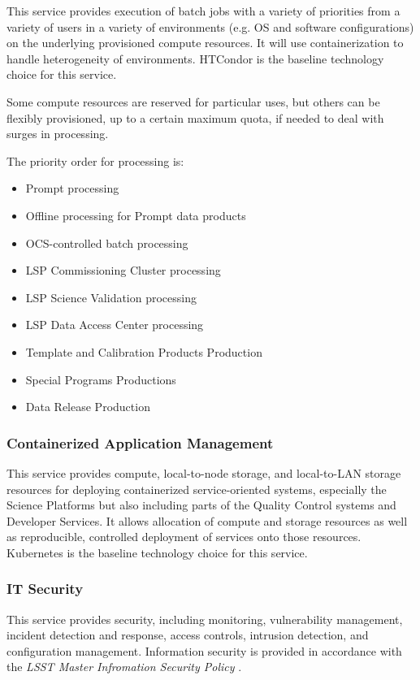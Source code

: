 \documentclass[DM,toc,lsstdraft]{lsstdoc}
\begin{document}
This service provides execution of batch jobs with a variety of priorities from a variety of users in a variety of environments (e.g. OS and software configurations) on the underlying provisioned compute resources.
It will use containerization to handle heterogeneity of environments.
HTCondor is the baseline technology choice for this service.

Some compute resources are reserved for particular uses, but others can
be flexibly provisioned, up to a certain maximum quota, if needed to
deal with surges in processing.

The priority order for processing is:
\begin{itemize}
\item
  Prompt processing
\item
  Offline processing for Prompt data products
\item
  OCS-controlled batch processing
\item
  LSP Commissioning Cluster processing
\item
  LSP Science Validation processing
\item
  LSP Data Access Center processing
\item
  Template and Calibration Products Production
\item
  Special Programs Productions
\item
  Data Release Production
\end{itemize}

\subsubsection{Containerized Application Management}\label{containerized-application-management}

This service provides compute, local-to-node storage, and local-to-LAN storage resources for deploying containerized service-oriented systems, especially the Science Platforms but also including parts of the Quality Control systems and Developer Services.
It allows allocation of compute and storage resources as well as reproducible, controlled deployment of services onto those resources.
Kubernetes is the baseline technology choice for this service.

\subsubsection{IT Security}\label{it-security}

This service provides security, including monitoring, vulnerability management, incident detection and response, access controls, intrusion detection, and configuration management.
Information security is provided in accordance with the \textit{LSST Master Infromation Security Policy} .
\end{document}
